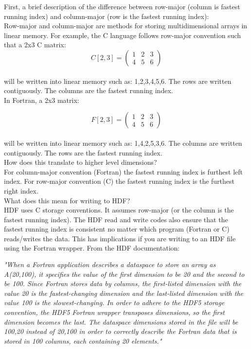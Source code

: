 \documentclass[12pt, letterpaper]{article}
\begin{document}
First, a brief description of the difference between row-major (column is fastest running index) and column-major (row is the fastest running index):\\

Row-major and column-major are methods for storing multidimensional arrays in linear memory. For example, the C language follows row-major convention such that a 2x3 C matrix:\\

\[
C[2,3] =
\begin{pmatrix}
1 & 2 & 3 \\
4 & 5 & 6
\end{pmatrix}
\] 
\\

will be written into linear memory such as: 1,2,3,4,5,6. The rows are written contiguously. The columns are the fastest running index.\\

In Fortran, a 2x3 matrix:

\[
F[2,3] =
\begin{pmatrix}
1 & 2 & 3 \\
4 & 5 & 6
\end{pmatrix}
\] 
\\

will be written into linear memory such as: 1,4,2,5,3,6. The columns are written contiguously. The rows are the fastest running index.\\

How does this translate to higher level dimensions?\\

For column-major convention (Fortran) the fastest running index is furthest left index. For row-major convention (C) the fastest running index is the furthest right index.\\

What does this mean for writing to HDF?\\

HDF uses C storage conventions. It assumes row-major (or the column is the fastest running index). The HDF read and write codes also ensure that the fastest running index is consistent no matter which program (Fortran or C) reads/writes the data. This has implications if you are writing to an HDF file using the Fortran wrapper. From the HDF documentation:

\begin{center}
\textit{"When a Fortran application describes a dataspace to store an array as A(20,100), it specifies the value of the first dimension to be 20 and the second to be 100. Since Fortran stores data by columns, the first-listed dimension with the value 20 is the fastest-changing dimension and the last-listed dimension with the value 100 is the slowest-changing. In order to adhere to the HDF5 storage convention, the HDF5 Fortran wrapper transposes dimensions, so the first dimension becomes the last. The dataspace dimensions stored in the file will be 100,20 instead of 20,100 in order to correctly describe the Fortran data that is stored in 100 columns, each containing 20 elements."}
\end{center}
 
\end{document}

